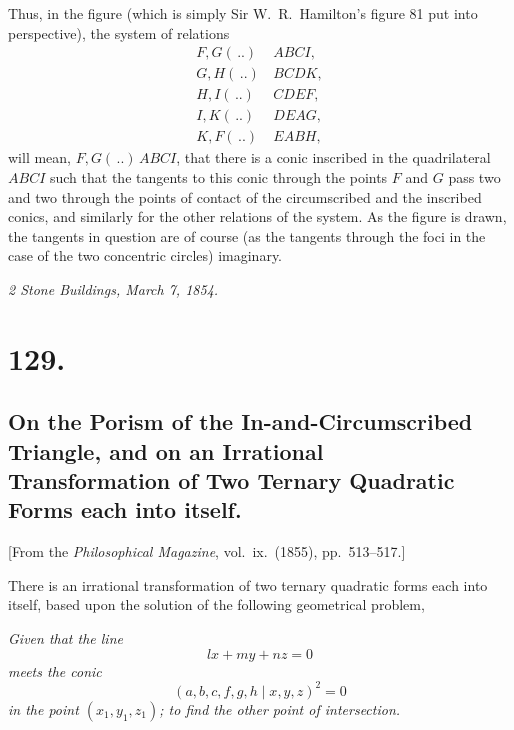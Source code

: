 \documentclass[11pt,a4paper]{article}
\begin{document}
\medskip

Thus, in the figure (which is simply Sir W.\ R.\ Hamilton's figure 81 put into perspective), the system of relations
\begin{align*}
F, G(\,..)\, &ABCI,\\
G, H(\,..)\, &BCDK,\\
H, I(\,..)\, &CDEF,\\
I, K(\,..)\, &DEAG,\\
K, F(\,..)\, &EABH,
\end{align*}
will mean, $F, G(\,..)\,ABCI$, that there is a conic inscribed in the quadrilateral $ABCI$ such that the tangents to this conic through the points $F$ and $G$ pass two and two through the points of contact of the circumscribed and the inscribed conics, and similarly for the other relations of the system. As the figure is drawn, the tangents in question are of course (as the tangents through the foci in the case of the two concentric circles) imaginary.

\medskip
\noindent\textit{2 Stone Buildings, March 7, 1854.}

\section*{129.}
\subsection*{On the Porism of the In-and-Circumscribed Triangle, and on an Irrational \\ Transformation of Two Ternary Quadratic Forms each into itself.}

[From the \textit{Philosophical Magazine}, vol.\ ix.\ (1855), pp.\ 513--517.]

\medskip

There is an irrational transformation of two ternary quadratic forms each into itself, based upon the solution of the following geometrical problem,

\medskip

\textit{Given that the line}
\[ lx + my + nz = 0 \]
\textit{meets the conic}
\[ (a, b, c, f, g, h \mid x, y, z)^2 = 0 \]
\textit{in the point $(x_1, y_1, z_1)$; to find the other point of intersection.}
\end{document}
